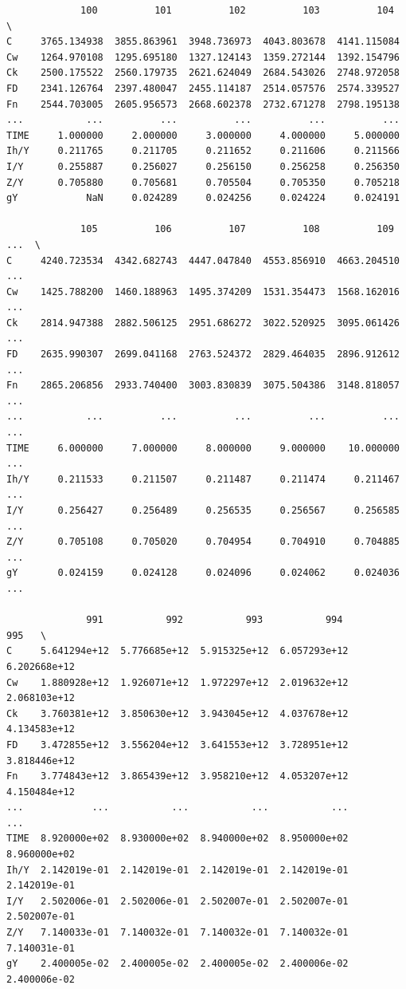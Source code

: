 \documentclass[11pt]{article}
\begin{document}
\begin{verbatim}
             100          101          102          103          104   \
C     3765.134938  3855.863961  3948.736973  4043.803678  4141.115084   
Cw    1264.970108  1295.695180  1327.124143  1359.272144  1392.154796   
Ck    2500.175522  2560.179735  2621.624049  2684.543026  2748.972058   
FD    2341.126764  2397.480047  2455.114187  2514.057576  2574.339527   
Fn    2544.703005  2605.956573  2668.602378  2732.671278  2798.195138   
...           ...          ...          ...          ...          ...   
TIME     1.000000     2.000000     3.000000     4.000000     5.000000   
Ih/Y     0.211765     0.211705     0.211652     0.211606     0.211566   
I/Y      0.255887     0.256027     0.256150     0.256258     0.256350   
Z/Y      0.705880     0.705681     0.705504     0.705350     0.705218   
gY            NaN     0.024289     0.024256     0.024224     0.024191   

             105          106          107          108          109   ...  \
C     4240.723534  4342.682743  4447.047840  4553.856910  4663.204510  ...   
Cw    1425.788200  1460.188963  1495.374209  1531.354473  1568.162016  ...   
Ck    2814.947388  2882.506125  2951.686272  3022.520925  3095.061426  ...   
FD    2635.990307  2699.041168  2763.524372  2829.464035  2896.912612  ...   
Fn    2865.206856  2933.740400  3003.830839  3075.504386  3148.818057  ...   
...           ...          ...          ...          ...          ...  ...   
TIME     6.000000     7.000000     8.000000     9.000000    10.000000  ...   
Ih/Y     0.211533     0.211507     0.211487     0.211474     0.211467  ...   
I/Y      0.256427     0.256489     0.256535     0.256567     0.256585  ...   
Z/Y      0.705108     0.705020     0.704954     0.704910     0.704885  ...   
gY       0.024159     0.024128     0.024096     0.024062     0.024036  ...   

              991           992           993           994           995   \
C     5.641294e+12  5.776685e+12  5.915325e+12  6.057293e+12  6.202668e+12   
Cw    1.880928e+12  1.926071e+12  1.972297e+12  2.019632e+12  2.068103e+12   
Ck    3.760381e+12  3.850630e+12  3.943045e+12  4.037678e+12  4.134583e+12   
FD    3.472855e+12  3.556204e+12  3.641553e+12  3.728951e+12  3.818446e+12   
Fn    3.774843e+12  3.865439e+12  3.958210e+12  4.053207e+12  4.150484e+12   
...            ...           ...           ...           ...           ...   
TIME  8.920000e+02  8.930000e+02  8.940000e+02  8.950000e+02  8.960000e+02   
Ih/Y  2.142019e-01  2.142019e-01  2.142019e-01  2.142019e-01  2.142019e-01   
I/Y   2.502006e-01  2.502006e-01  2.502007e-01  2.502007e-01  2.502007e-01   
Z/Y   7.140033e-01  7.140032e-01  7.140032e-01  7.140032e-01  7.140031e-01   
gY    2.400005e-02  2.400005e-02  2.400005e-02  2.400006e-02  2.400006e-02   


\end{verbatim}
\end{document}
